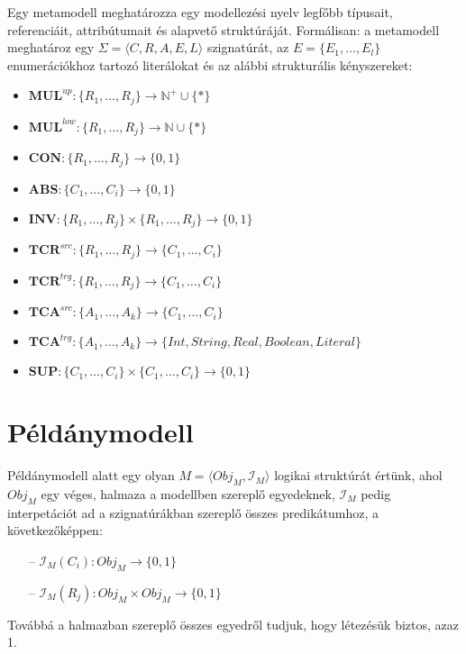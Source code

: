 \begin{definition}[Metamodell]
Egy metamodell meghatározza egy modellezési nyelv legfőbb típusait, referenciáit, attribútumait és alapvető struktúráját. Formálisan: a metamodell meghatároz egy $\Sigma = \langle\mathit{C}, \mathit{R}, \mathit{A}, \mathit{E}, \mathit{L}\rangle$ szignatúrát, az $E = \{E_1, \ldots, E_l\}$ enumerációkhoz tartozó literálokat és az alábbi strukturális kényszereket:
\begin{itemize}
  \item $ \mathit{\textbf{MUL}}^\mathit{up}:  \{R_1, \ldots, R_j \} \rightarrow \mathbb{N}^+ \cup  \{*\} $
  
  \item $ \mathit{\textbf{MUL}}^\mathit{low}:  \{R_1, \ldots, R_j \} \rightarrow \mathbb{N} \cup  \{*\} $
  
  \item $ \mathit{\textbf{CON}}: \{R_1, \ldots, R_j \} \rightarrow \{0, 1\} $
  \item $ \mathit{\textbf{ABS}}: \{C_1, \ldots, C_i \} \rightarrow \{0, 1\} $
  \item $ \mathit{\textbf{INV}}: \{R_1, \ldots, R_j \} \times \{R_1, \ldots, R_j\} \rightarrow \{0, 1\} $
  \item $ \mathit{\textbf{TCR}}^\mathit{src}: \{R_1, \ldots, R_j \} \rightarrow \{C_1, \ldots, C_i\} $  
  \item $ \mathit{\textbf{TCR}}^\mathit{trg}: \{R_1, \ldots, R_j \} \rightarrow \{C_1, \ldots, C_i\} $
  \item $ \mathit{\textbf{TCA}}^\mathit{src}: \{A_1, \ldots, A_k\} \rightarrow \{C_1, \ldots, C_i\} $
  \item $ \mathit{\textbf{TCA}}^\mathit{trg}: \{A_1, \ldots, A_k\} \rightarrow \{\mathit{Int, String, Real, Boolean, Literal}\}$
  \item $ \mathit{\textbf{SUP}}: \{C_1, \ldots, C_i\} \times \{C_1, \ldots, C_i\} \rightarrow \{0, 1\} $ 
\end{itemize}

\end{definition}


\section{Példánymodell}
\begin{definition}[Példánymodell]
Példánymodell alatt egy olyan $M = \langle Obj_M, \mathcal{I}_M \rangle$ logikai struktúrát értünk, ahol $Obj_M $ egy véges, halmaza a modellben szereplő egyedeknek, $\mathcal{I}_M$ pedig interpetációt ad a szignatúrákban szereplő összes predikátumhoz, a következőképpen:
\begin{itemize}
\item[--] $\mathcal{I}_M(C_i) : Obj_M \rightarrow \{0, 1\}$
\item[--] $\mathcal{I}_M(R_j) : Obj_M \times Obj_M \rightarrow \{0, 1\}$
\end{itemize}
Továbbá a halmazban szereplő összes egyedről tudjuk, hogy létezésük biztos, azaz 1.
\end{definition}


